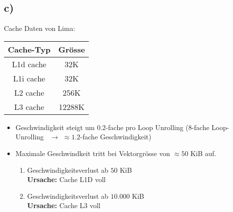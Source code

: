 \documentclass{article}
\begin{document}
\subsection*{c)}
Cache Daten von Lima:\\
\begin{center}
	\begin{tabular}{| c || c |}
		\hline
		Cache-Typ             & Gr\"osse \\
		\hline
		\hline
		L1d cache             &    32K\\
		\hline
		L1i cache             &    32K\\
		\hline
		L2 cache              &    256K\\
		\hline
		L3 cache              &    12288K\\
		\hline
	\end{tabular}
\end{center}

\begin{itemize}
	\item Geschwindigkeit steigt um $0.2$-fache pro Loop Unrolling ($8$-fache Loop-Unrolling \
		$\rightarrow$ $\approx 1.2$-fache Geschwindigkeit)
	\item Maximale Geschwindkeit tritt bei Vektorgr\"osse von $\approx 50$ KiB auf.
		\begin{enumerate}
			\item Geschwindigkeitsverlust ab $50$ KiB\\ \textbf{Ursache:} Cache L1D voll
			\item Geschwindigkeitsverlust ab $10.000$ KiB\\ \textbf{Ursache:} Cache L3 voll
		\end{enumerate}
\end{itemize}
\end{document}
